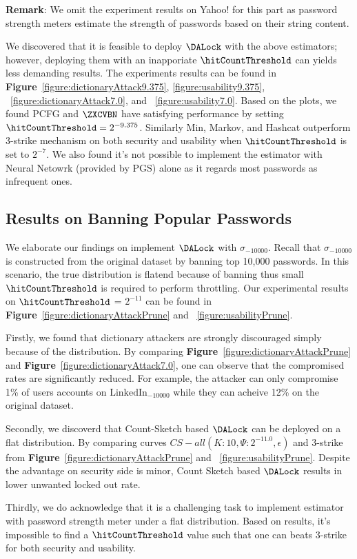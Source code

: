 \noindent\textbf{Remark}: We omit the experiment results on Yahoo! for this part as password strength meters estimate the strength of passwords based on their string content. 

We discovered that it is feasible to deploy $\DALock$ with the above estimators; however, deploying them with an inapporiate $\hitCountThreshold$ can yields less demanding results. The experiments results can be found in \textbf{Figure}~\ref{figure:dictionaryAttack9.375}, \ref{figure:usability9.375}, ~\ref{figure:dictionaryAttack7.0}, and ~\ref{figure:usability7.0}. Based on the plots, we found PCFG and $\ZXCVBN$ have satisfying performance by setting $\hitCountThreshold = 2^{-9.375}$. Similarly Min, Markov, and Hashcat outperform 3-strike mechanism on both security and usability when $\hitCountThreshold$ is set to $2^{-7}$. We also found it's not possible to implement the estimator with Neural Netowrk (provided by PGS) alone as it regards most passwords as infrequent ones. 

\subsection{Results on Banning Popular Passwords}
We elaborate our findings on implement $\DALock$ with $\sigma_{-10000}$. Recall that $\sigma_{-10000}$ is constructed from the original dataset by banning top 10,000 passwords. In this scenario, the true distribution is flatend because of banning thus small $\hitCountThreshold$ is required to perform throttling. Our experimental results on $\hitCountThreshold$ = $2^{-11}$ can be found in \textbf{Figure}~\ref{figure:dictionaryAttackPrune} and ~\ref{figure:usabilityPrune}. 

Firstly, we found that dictionary attackers are strongly discouraged simply because of the distribution. By comparing \textbf{Figure}~\ref{figure:dictionaryAttackPrune} and \textbf{Figure}~\ref{figure:dictionaryAttack7.0}, one can observe that the compromised rates are significantly reduced. For example, the attacker can only compromise 1\% of users accounts on $\text{LinkedIn}_{-10000}$ while they can acheive 12\% on the original dataset. 

Secondly, we discoverd that Count-Sketch based $\DALock$ can be deployed on a flat distribution. By comparing curves $CS-all(K:10,\Psi: 2^{-11.0}, \epsilon)$ and 3-strike from \textbf{Figure}~\ref{figure:dictionaryAttackPrune}  and ~\ref{figure:usabilityPrune}. Despite the advantage on security side is minor, Count Sketch based $\DALock$ results in lower unwanted locked out rate. 

Thirdly, we do acknowledge that it is a challenging task to implement estimator with password strength meter under a flat distribution. Based on results, it's impossible to find a $\hitCountThreshold$ value such that one can beats 3-strike for both security and usability. 





